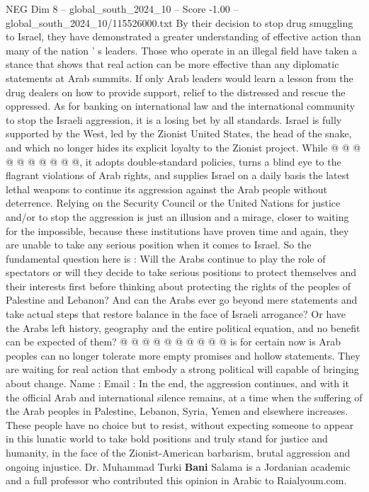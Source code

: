 \begin{textsample}{NEG Dim 8 – global\_south\_2024\_10 – Score -1.00 – global\_south\_2024\_10/115526000.txt}
By their decision to stop drug smuggling to Israel, they have demonstrated a greater understanding of effective action than many of the nation ' s leaders.
Those who operate in an illegal field have taken a stance that shows that real action can be more effective than any diplomatic statements at Arab summits.
If only Arab leaders would learn a lesson from the drug dealers on how to provide support, relief to the distressed and rescue the oppressed.
As for banking on international law and the international community to stop the Israeli aggression, it is a losing bet by all standards.
Israel is fully supported by the West, led by the Zionist United States, the head of the snake, and which no longer hides its explicit loyalty to the Zionist project.
While @ @ @ @ @ @ @ @ @ @, it adopts double-standard policies, turns a blind eye to the flagrant violations of Arab rights, and supplies Israel on a daily basis the latest lethal weapons to continue its aggression against the Arab people without deterrence.
Relying on the Security Council or the United Nations for justice and/or to stop the aggression is just an illusion and a mirage, closer to waiting for the impossible, because these institutions have proven time and again, they are unable to take any serious position when it comes to Israel.
So the fundamental question here is : Will the Arabs continue to play the role of spectators or will they decide to take serious positions to protect themselves and their interests first before thinking about protecting the rights of the peoples of Palestine and Lebanon?
And can the Arabs ever go beyond mere statements and take actual steps that restore balance in the face of Israeli arrogance?
Or have the Arabs left history, geography and the entire political equation, and no benefit can be expected of them? @ @ @ @ @ @ @ @ @ @ is for certain now is Arab peoples can no longer tolerate more empty promises and hollow statements.
They are waiting for real action that embody a strong political will capable of bringing about change.
Name : Email : In the end, the aggression continues, and with it the official Arab and international silence remains, at a time when the suffering of the Arab peoples in Palestine, Lebanon, Syria, Yemen and elsewhere increases.
These people have no choice but to resist, without expecting someone to appear in this lunatic world to take bold positions and truly stand for justice and humanity, in the face of the Zionist-American barbarism, brutal aggression and ongoing injustice.
Dr.
Muhammad Turki \textbf{Bani} Salama is a Jordanian academic and a full professor who contributed this opinion in Arabic to Raialyoum.com.

\end{textsample}
